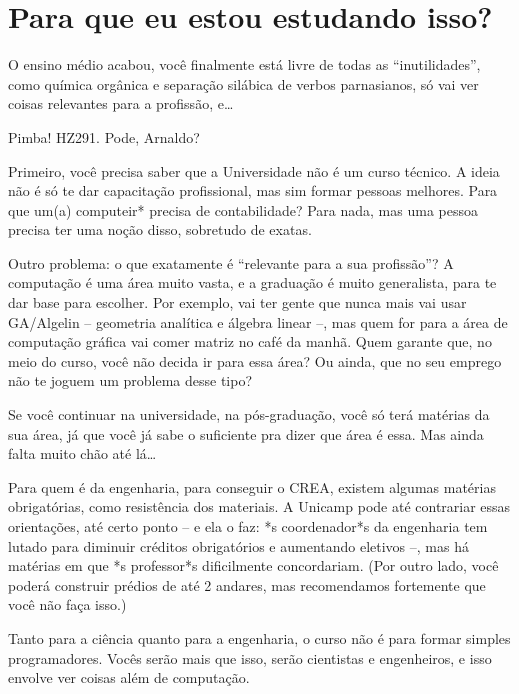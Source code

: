 
\section{Para que eu estou estudando isso?}

O ensino médio acabou, você finalmente está livre de todas as ``inutilidades'',
como química orgânica e separação silábica de verbos parnasianos, só vai ver
coisas relevantes para a profissão, e{\dots}

Pimba! HZ291. Pode, Arnaldo?

Primeiro, você precisa saber que a Universidade não é um curso técnico. A ideia
não é só te dar capacitação profissional, mas sim formar pessoas melhores. Para
que um(a) computeir* precisa de contabilidade? Para nada, mas uma pessoa
precisa ter uma noção disso, sobretudo de exatas.

Outro problema: o que exatamente é ``relevante para a sua profissão''?  A
computação é uma área muito vasta, e a graduação é muito generalista, para te
dar base para escolher. Por exemplo, vai ter gente que nunca mais vai usar
GA/Algelin -- geometria analítica e álgebra linear --, mas quem for para a área
de computação gráfica vai comer matriz no café da manhã. Quem garante que, no
meio do curso, você não decida ir para essa área? Ou ainda, que no seu emprego
não te joguem um problema desse tipo?

Se você continuar na universidade, na pós-graduação, você só terá matérias da
sua área, já que você já sabe o suficiente pra dizer que área é essa. Mas ainda
falta muito chão até lá{\dots}

Para quem é da engenharia, para conseguir o CREA, existem algumas matérias
obrigatórias, como resistência dos materiais. A Unicamp pode até contrariar
essas orientações, até certo ponto -- e ela o faz: *s coordenador*s da
engenharia tem lutado para diminuir créditos obrigatórios e aumentando
eletivos --, mas há matérias em que *s professor*s dificilmente concordariam.
(Por outro lado, você poderá construir prédios de até 2 andares, mas
recomendamos fortemente que você não faça isso.)

Tanto para a ciência quanto para a engenharia, o curso não é para formar
simples programadores. Vocês serão mais que isso, serão cientistas e
engenheiros, e isso envolve ver coisas além de computação.
